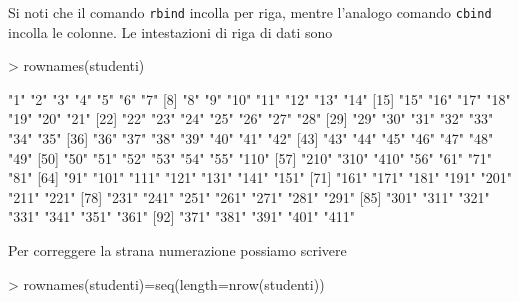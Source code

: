 \documentclass[onecolumn,12pt]{book}
\begin{document}
Si noti che il comando \texttt{rbind}  incolla per riga, mentre l'analogo comando \texttt{cbind}
 incolla le colonne.
Le intestazioni di riga di dati sono
\begin{Schunk}
\begin{Sinput}
> rownames(studenti)
\end{Sinput}
\begin{Soutput}
 [1] "1"   "2"   "3"   "4"   "5"   "6"   "7"  
 [8] "8"   "9"   "10"  "11"  "12"  "13"  "14" 
[15] "15"  "16"  "17"  "18"  "19"  "20"  "21" 
[22] "22"  "23"  "24"  "25"  "26"  "27"  "28" 
[29] "29"  "30"  "31"  "32"  "33"  "34"  "35" 
[36] "36"  "37"  "38"  "39"  "40"  "41"  "42" 
[43] "43"  "44"  "45"  "46"  "47"  "48"  "49" 
[50] "50"  "51"  "52"  "53"  "54"  "55"  "110"
[57] "210" "310" "410" "56"  "61"  "71"  "81" 
[64] "91"  "101" "111" "121" "131" "141" "151"
[71] "161" "171" "181" "191" "201" "211" "221"
[78] "231" "241" "251" "261" "271" "281" "291"
[85] "301" "311" "321" "331" "341" "351" "361"
[92] "371" "381" "391" "401" "411"
\end{Soutput}
\end{Schunk}
Per correggere la strana numerazione possiamo scrivere
\begin{Schunk}
\begin{Sinput}
> rownames(studenti)=seq(length=nrow(studenti))
\end{Sinput}
\end{Schunk}
\end{document}
